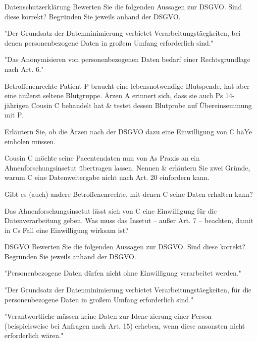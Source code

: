 \documentclass{exercisesheet}
\begin{document}
{
\begin{exercise*}[2]{Datenschutzerklärung}{
    Bewerten Sie die folgenden Aussagen zur DSGVO. Sind diese korrekt? Begründen Sie jeweils anhand der DSGVO.
  }
  \item "Der Grundsatz der Datenminimierung verbietet Verarbeitungstäegkeiten, bei denen personenbezogene Daten in großem Umfang erforderlich sind."
  \item "Das Anonymisieren von personenbezogenen Daten bedarf einer Rechtsgrundlage nach Art. 6."
\end{exercise*}

\begin{exercise*}{Betroffenenrechte}{
    Patient P braucht eine lebensnotwendige Blutspende, hat aber eine äußerst seltene Blutgruppe. Ärzen A erinnert sich, dass sie auch Ps 14-jährigen Cousin C behandelt hat \& testet dessen Blutprobe auf Übereinsemmung mit P.
  }
  \item Erläutern Sie, ob die Ärzen nach der DSGVO dazu eine Einwilligung von C häYe einholen müssen.
  \item Cousin C möchte seine Paeentendaten nun von As Praxis an ein Ahnenforschungsinsetut übertragen lassen. Nennen \& erläutern Sie zwei Gründe, warum C eine Datenweitergabe nicht nach Art. 20 einfordern kann.
  \item Gibt es (auch) andere Betroffenenrechte, mit denen C seine Daten erhalten kann?
  \item Das Ahnenforschungsinsetut lässt sich von C eine Einwilligung für die Datenverarbeitung geben. Was muss das Insetut – außer Art. 7 – beachten, damit in Cs Fall eine Einwilligung wirksam ist?
\end{exercise*}

\begin{exercise*}{DSGVO}{
    Bewerten Sie die folgenden Aussagen zur DSGVO. Sind diese korrekt? Begründen Sie jeweils anhand der DSGVO.
  }
  \item "Personenbezogene Daten dürfen nicht ohne Einwilligung verarbeitet werden."
  \item "Der Grundsatz der Datenminimierung verbietet Verarbeitungstäegkeiten, für die personenbezogene Daten in großem Umfang erforderlich sind."
  \item "Verantwortliche müssen keine Daten zur Idene zierung einer Person (beispielsweise bei Anfragen nach Art. 15) erheben, wenn diese ansonsten nicht erforderlich wären."
\end{exercise*}

}
\end{document}

